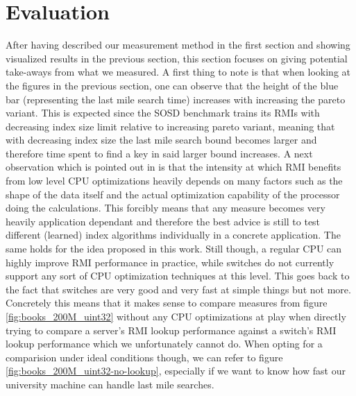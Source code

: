\section{Evaluation}
After having described our measurement method in the first section and showing visualized results in the previous section, this section focuses on giving potential take-aways from what we measured. A first thing to note is that when looking at the figures in the previous section, one can observe that the height of the blue bar (representing the last mile search time) increases with increasing the pareto variant. This is expected since the SOSD benchmark trains its RMIs with decreasing index size limit relative to increasing pareto variant, meaning that with decreasing index size the last mile search bound becomes larger and therefore time spent to find a key in said larger bound increases. A next observation which is pointed out in \cite{sosd-neurips} is that the intensity at which RMI benefits from low level CPU optimizations heavily depends on many factors such as the shape of the data itself and the actual optimization capability of the processor doing the calculations. This forcibly means that any measure becomes very heavily application dependant and therefore the best advice is still to test different (learned) index algorithms individually in a concrete application. The same holds for the idea proposed in this work. Still though, a regular CPU can highly improve RMI performance in practice, while switches do not currently support any sort of CPU optimization techniques at this level. This goes back to the fact that switches are very good and very fast at simple things but not more. Concretely this means that it makes sense to compare measures from figure \ref{fig:books_200M_uint32} without any CPU optimizations at play when directly trying to compare a server's RMI lookup performance against a switch's RMI lookup performance which we unfortunately cannot do. When opting for a comparision under ideal conditions though, we can refer to figure \ref{fig:books_200M_uint32-no-lookup}, especially if we want to know how fast our university machine can handle last mile searches.\\

